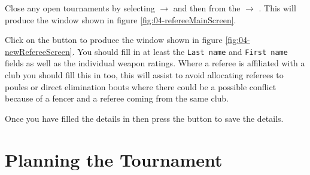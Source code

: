 \documentclass[a4paper,11pt]{memoir}
\begin{document}
Close any open tournaments by selecting  $\rightarrow$  and then from the  $\rightarrow$ . This will produce the window shown in figure \ref{fig:04-refereeMainScreen}.

Click on the  button to produce the window shown in figure \ref{fig:04-newRefereeScreen}. You should fill in at least the \texttt{Last name} and \texttt{First name} fields as well as the individual weapon ratings. Where a referee is affiliated with a club you should fill this in too, this will assist \fencingtime{} to avoid allocating referees to poules or direct elimination bouts where there could be a possible conflict because of a fencer and a referee coming from the same club.

Once you have filled the details in then press the  button to save the details.

\chapter{Planning the Tournament}
\end{document}
